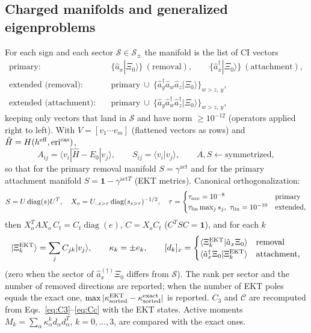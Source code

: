 \documentclass[11pt,a4paper]{article}
\newcommand{\ket}[1]{|#1\rangle}
\newcommand{\braket}[1]{\langle#1\rangle}
\newcommand{\act}{\mathrm{act}}
\begin{document}
\subsection{Charged manifolds and generalized eigenproblems}

For each sign and each sector $\mathcal S\in\mathcal S_\pm$ the manifold is
the list of CI vectors
\begin{align}
  \text{primary:}&\quad \{\hat a_x\ket{\Xi_0}\}\ (\text{removal}),\qquad \{\hat a_x^\dagger\ket{\Xi_0}\}\ (\text{attachment}),
  \label{eq:man-primary}\\
  \text{extended (removal):}&\quad \text{primary}\ \cup\ \{\hat a_y^\dagger\hat a_w\hat a_z\ket{\Xi_0}\}_{w>z,\ y},
  \label{eq:man-extended}\\
  \text{extended (attachment):}&\quad \text{primary}\ \cup\ \{\hat a_y\hat a_w^\dagger\hat a_z^\dagger\ket{\Xi_0}\}_{w>z,\ y},\nonumber
\end{align}
keeping only vectors that land in $\mathcal S$ and have norm $\ge10^{-12}$
(operators applied right to left).  With $V=[v_1\cdots v_m]$ (flattened
vectors as rows) and $\hat H=H(h^{\rm eff},\mathrm{eri}^{\rm cas})$,
\begin{equation}
  A_{ij}=\braket{v_i|\hat H-E_0|v_j},\qquad S_{ij}=\braket{v_i|v_j},\qquad
  A,S\leftarrow\text{symmetrized},
  \label{eq:ekt-AS}
\end{equation}
so that for the primary removal manifold $S=\gamma^{\act}$ and for the
primary attachment manifold $S=\mathbf 1-\gamma^{\act T}$ (EKT metrics).
Canonical orthogonalization:
\begin{equation}
  S=U\operatorname{diag}(s)U^{T},\quad
  X_o=U_{:,s>\tau}\operatorname{diag}(s_{s>\tau})^{-1/2},\quad
  \tau=\begin{cases}\tau_{\rm occ}=10^{-8}&\text{primary}\\ \tau_{\rm lin}\max_js_j,\ \tau_{\rm lin}=10^{-10}&\text{extended,}\end{cases}
  \label{eq:canon-orth}
\end{equation}
then $X_o^{T}AX_o\,C_t=C_t\operatorname{diag}(e)$, $C=X_oC_t$
($C^{T}SC=\mathbf 1$), and for each $k$
\begin{equation}
  \ket{\Xi^{\rm EKT}_k}=\sum_jC_{jk}\ket{v_j},\qquad
  \kappa_k=\pm e_k,\qquad
  [d_k]_x=\begin{cases}\braket{\Xi^{\rm EKT}_k|\hat a_x\Xi_0}&\text{removal}\\ \braket{\hat a_x^\dagger\Xi_0|\Xi^{\rm EKT}_k}&\text{attachment,}\end{cases}
  \label{eq:ekt-poles}
\end{equation}
(zero when the sector of $\hat a_x^{(\dagger)}\Xi_0$ differs from $\mathcal S$).
The rank per sector and the number of removed directions are reported; when
the number of EKT poles equals the exact one,
$\max|\kappa^{\rm EKT}_{\rm sorted}-\kappa^{\rm exact}_{\rm sorted}|$ is
reported.  $C_3$ and $\mathcal C$ are recomputed from
Eqs.~\eqref{eq:C3}--\eqref{eq:Cc} with the EKT states.  Active moments
$M_k=\sum_\alpha\kappa_\alpha^kd_\alpha d_\alpha^{T}$, $k=0,\ldots,3$, are
compared with the exact ones.
\end{document}
